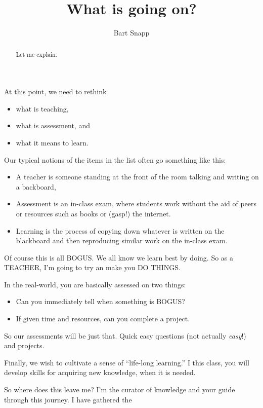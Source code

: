 \documentclass{ximera}
\author{Bart Snapp}
\title{What is going on?}
\begin{document}
\begin{abstract}
  Let me explain. 
\end{abstract}
\maketitle

At this point, we need to rethink
\begin{itemize}
\item what is teaching,
\item what is assessment, and
\item what it means to learn.
\end{itemize}
Our typical notions of the items in the list often go something like
this:
\begin{itemize}
\item A teacher is someone standing at the front of the room talking
  and writing on a backboard,
\item Assessment is an in-class exam, where students work without the
  aid of peers or resources such as books or (gasp!) the internet.
\item Learning is the process of copying down whatever is written on
  the blackboard and then reproducing similar work on the in-class
  exam.
\end{itemize}

Of course this is all BOGUS. We all know we learn best by doing.
So as a TEACHER, I'm going to try an make you DO THINGS.

In the real-world, you are basically assessed on two things:
\begin{itemize}
\item Can you immediately tell when something is BOGUS?
\item If given time and resources, can you complete a project.
\end{itemize}

So our assessments will be just that. Quick easy questions (not
actually \textit{easy}!) and projects.

Finally, we wish to cultivate a sense of ``life-long learning.''  I
this class, you will develop skills for acquiring new knowledge, when
it is needed.



So where does this leave me? I'm the curator of knowledge and your
guide through this journey. I have gathered the
\end{document}
